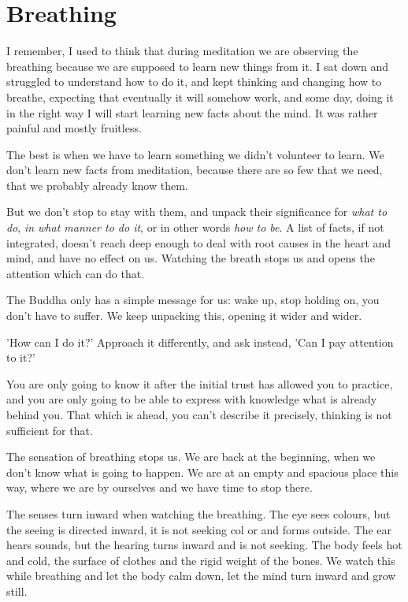 \hypertarget{breathing-1}{%
\chapter{Breathing}\label{breathing-1}}

I remember, I used to think that during meditation we are observing the
breathing because we are supposed to learn new things from it. I sat
down and struggled to understand how to do it, and kept thinking and
changing how to breathe, expecting that eventually it will somehow work,
and some day, doing it in the right way I will start learning new facts
about the mind. It was rather painful and mostly fruitless.

The best is when we have to learn something we didn't volunteer to
learn. We don't learn new facts from meditation, because there are so
few that we need, that we probably already know them.

But we don't stop to stay with them, and unpack their significance for
\emph{what to do}, \emph{in what manner to do it}, or in other words
\emph{how to be}. A list of facts, if not integrated, doesn't reach deep
enough to deal with root causes in the heart and mind, and have no
effect on us. Watching the breath stops us and opens the attention which
can do that.

The Buddha only has a simple message for us: wake up, stop holding on,
you don't have to suffer. We keep unpacking this, opening it wider and
wider.

'How can I do it?' Approach it differently, and ask instead, 'Can I pay
attention to it?'

You are only going to know it after the initial trust has allowed you to
practice, and you are only going to be able to express with knowledge
what is already behind you. That which is ahead, you can't describe it
precisely, thinking is not sufficient for that.

The sensation of breathing stops us. We are back at the beginning, when
we don't know what is going to happen. We are at an empty and spacious
place this way, where we are by ourselves and we have time to stop
there.

The senses turn inward when watching the breathing. The eye sees
colours, but the seeing is directed inward, it is not seeking col or and
forms outside. The ear hears sounds, but the hearing turns inward and is
not seeking. The body feels hot and cold, the surface of clothes and the
rigid weight of the bones. We watch this while breathing and let the
body calm down, let the mind turn inward and grow still.

